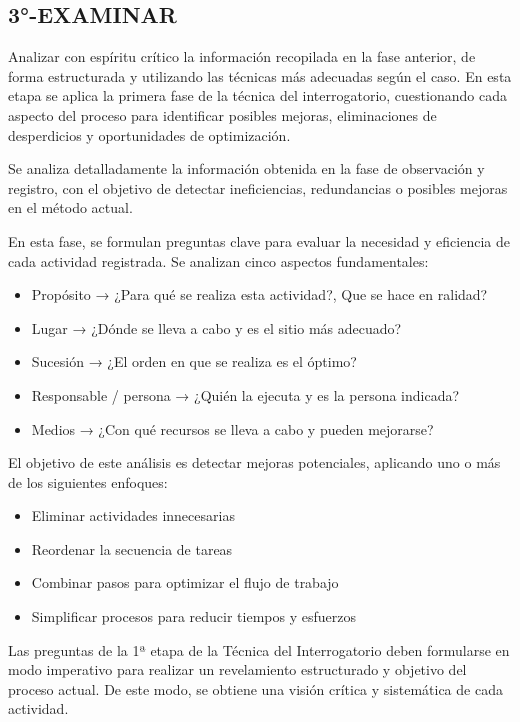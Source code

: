 \documentclass[a4paper,oneside,11pt]{article}
\begin{document}
\subsection{3°-EXAMINAR}

Analizar con espíritu crítico la información recopilada en la fase anterior, de forma estructurada y utilizando las técnicas más adecuadas según el caso. En esta etapa se aplica la primera fase de la técnica del interrogatorio, cuestionando cada aspecto del proceso para identificar posibles mejoras, eliminaciones de desperdicios y oportunidades de optimización.

Se analiza detalladamente la información obtenida en la fase de observación y registro, con el objetivo de detectar ineficiencias, redundancias o posibles mejoras en el método actual.

En esta fase, se formulan preguntas clave para evaluar la necesidad y eficiencia de cada actividad registrada. Se analizan cinco aspectos fundamentales:

\begin{itemize}
    \item Propósito → ¿Para qué se realiza esta actividad?, Que se hace en ralidad?
    \item Lugar → ¿Dónde se lleva a cabo y es el sitio más adecuado?
    \item Sucesión → ¿El orden en que se realiza es el óptimo?
    \item Responsable / persona  → ¿Quién la ejecuta y es la persona indicada?
    \item Medios → ¿Con qué recursos se lleva a cabo y pueden mejorarse?
\end{itemize}

El objetivo de este análisis es detectar mejoras potenciales, aplicando uno o más de los siguientes enfoques:

\begin{itemize}
    \item Eliminar actividades innecesarias
    \item Reordenar la secuencia de tareas
    \item Combinar pasos para optimizar el flujo de trabajo
    \item Simplificar procesos para reducir tiempos y esfuerzos
\end{itemize}

Las preguntas de la 1ª etapa de la Técnica del Interrogatorio deben formularse en modo imperativo para realizar un revelamiento estructurado y objetivo del proceso actual. De este modo, se obtiene una visión crítica y sistemática de cada actividad.
\end{document}
